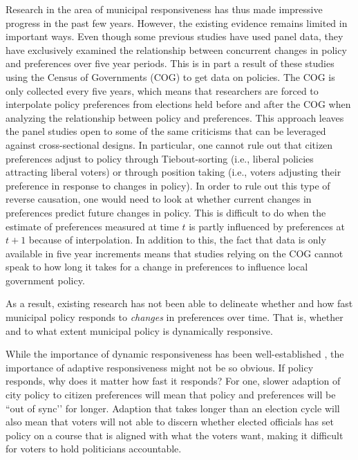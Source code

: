 \documentclass[a4paper,12pt]{article}
\begin{document}
 
Research in the area of municipal responsiveness has thus made impressive progress in the past few years. However, the existing evidence remains limited in important ways. Even though some previous studies have used panel data, they have exclusively examined  the relationship between concurrent changes in policy and preferences over five year periods.  This is in part a result of these studies using the Census of  Governments (COG) to get data on policies. The COG is only collected every five years, which means that researchers are forced to interpolate policy preferences from elections held before and after the COG when analyzing the relationship between policy and preferences. This approach leaves the panel studies open to some of the same criticisms that can be leveraged against cross-sectional designs. In particular, one cannot rule out that citizen preferences adjust to policy through Tiebout-sorting (i.e., liberal policies attracting liberal voters) or through position taking  (i.e., voters adjusting their preference in response to changes in policy). In order to rule out this type of reverse causation, one would need to look at whether current changes in preferences predict future changes in policy. This is difficult to do when the estimate of preferences measured at time $t$ is partly influenced by preferences at $t+1$ because of interpolation. In addition to this, the fact that data is only available in five year increments means that studies relying on the COG cannot speak to how long it takes for a change in preferences to influence local government policy. 


As a result, existing research has not been able to delineate whether and how fast municipal policy responds to \textit{changes} in preferences over time. That is, whether and to what extent municipal policy is dynamically responsive. 

While the importance of dynamic responsiveness has been well-established \citep{stimson1995dynamic}, the importance of adaptive responsiveness might not be so obvious. If policy responds, why does it matter how fast it responds? For one, slower adaption of city policy to citizen preferences will mean that policy and preferences will be ``out of sync’’ for longer. Adaption that takes longer than an election cycle will also mean that voters will not able to discern whether elected officials has set policy on a course that is aligned with what the voters want, making it difficult for voters to hold politicians accountable.
\end{document}
